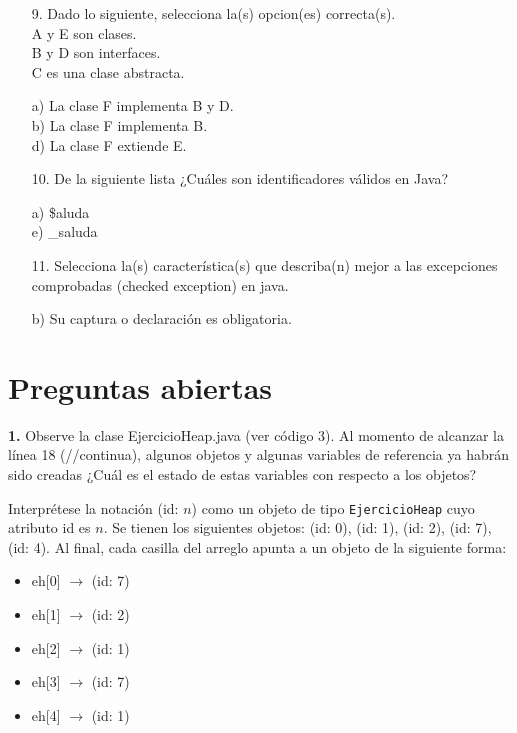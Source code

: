 \documentclass{article}
\begin{document}
\begin{itemize}
\item[9.] Dado lo siguiente, selecciona la(s) opcion(es) correcta(s).\\
A y E son clases.\\
B y D son interfaces.\\
C es una clase abstracta.

a) La clase F implementa B y D.\\
b) La clase F implementa B.\\
d) La clase F extiende E.

\item[10.] De la siguiente lista ¿Cuáles son identificadores válidos en Java?

a) \$aluda\\
e) \_saluda

\item[11.] Selecciona la(s) característica(s) que describa(n) mejor a las excepciones comprobadas (checked exception) en java.

b) Su captura o declaración es obligatoria.

\end{itemize}

\section{Preguntas abiertas}

\textbf{1.} Observe la clase EjercicioHeap.java (ver código 3). Al momento de alcanzar la línea 18 (//continua), algunos objetos y algunas variables de referencia ya habrán sido creadas ¿Cuál es el estado de estas variables con respecto a los objetos?

Interprétese la notación (id: $n$) como un objeto de tipo \texttt{EjercicioHeap} cuyo atributo id es $n$. Se tienen los siguientes objetos: (id: 0), (id: 1), (id: 2), (id: 7), (id: 4). Al final, cada casilla del arreglo apunta a un objeto de la siguiente forma:

\begin{itemize}
\item eh[0] $\rightarrow$ (id: 7)
\item eh[1] $\rightarrow$ (id: 2)
\item eh[2] $\rightarrow$ (id: 1)
\item eh[3] $\rightarrow$ (id: 7)
\item eh[4] $\rightarrow$ (id: 1)
\end{itemize}

\vspace{5mm}
\end{document}

